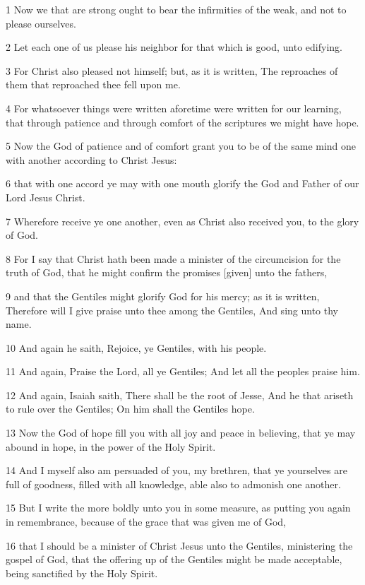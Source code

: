 \par 1 Now we that are strong ought to bear the infirmities of the weak, and not to please ourselves.
\par 2 Let each one of us please his neighbor for that which is good, unto edifying.
\par 3 For Christ also pleased not himself; but, as it is written, The reproaches of them that reproached thee fell upon me.
\par 4 For whatsoever things were written aforetime were written for our learning, that through patience and through comfort of the scriptures we might have hope.
\par 5 Now the God of patience and of comfort grant you to be of the same mind one with another according to Christ Jesus:
\par 6 that with one accord ye may with one mouth glorify the God and Father of our Lord Jesus Christ.
\par 7 Wherefore receive ye one another, even as Christ also received you, to the glory of God.
\par 8 For I say that Christ hath been made a minister of the circumcision for the truth of God, that he might confirm the promises [given] unto the fathers,
\par 9 and that the Gentiles might glorify God for his mercy; as it is written, Therefore will I give praise unto thee among the Gentiles, And sing unto thy name.
\par 10 And again he saith, Rejoice, ye Gentiles, with his people.
\par 11 And again, Praise the Lord, all ye Gentiles; And let all the peoples praise him.
\par 12 And again, Isaiah saith, There shall be the root of Jesse, And he that ariseth to rule over the Gentiles; On him shall the Gentiles hope.
\par 13 Now the God of hope fill you with all joy and peace in believing, that ye may abound in hope, in the power of the Holy Spirit.
\par 14 And I myself also am persuaded of you, my brethren, that ye yourselves are full of goodness, filled with all knowledge, able also to admonish one another.
\par 15 But I write the more boldly unto you in some measure, as putting you again in remembrance, because of the grace that was given me of God,
\par 16 that I should be a minister of Christ Jesus unto the Gentiles, ministering the gospel of God, that the offering up of the Gentiles might be made acceptable, being sanctified by the Holy Spirit.
